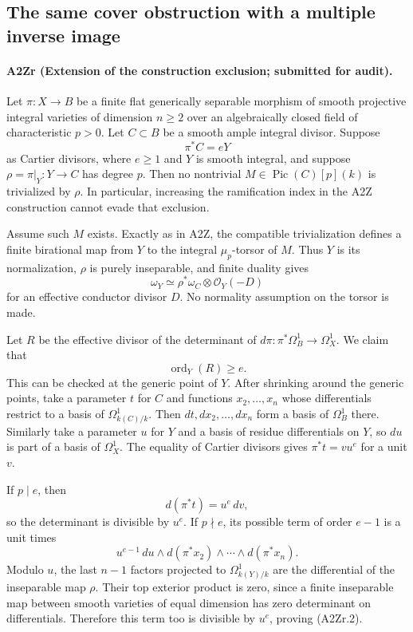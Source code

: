 \subsection{The same cover obstruction with a multiple inverse image}
\paragraph{A2Zr (Extension of the construction exclusion; submitted for audit).}
Let $\pi:X\to B$ be a finite flat generically separable morphism of
smooth projective integral varieties of dimension $n\geq2$ over an
algebraically closed field of characteristic $p>0$. Let $C\subset B$
be a smooth ample integral divisor. Suppose
\[
 \pi^*C=eY
\]
as Cartier divisors, where $e\geq1$ and $Y$ is smooth integral, and
suppose $\rho=\pi|_Y:Y\to C$ has degree $p$.
Then no nontrivial $M\in\operatorname{Pic}(C)[p](k)$ is trivialized
by $\rho$. In particular, increasing the ramification index in the
A2Z construction cannot evade that exclusion.

Assume such $M$ exists. Exactly as in A2Z, the compatible
trivialization defines a finite birational map from $Y$ to the
integral $\mu_p$-torsor of $M$. Thus $Y$ is its normalization,
$\rho$ is purely inseparable, and finite duality gives
\[
 \omega_Y\simeq\rho^*\omega_C\otimes\mathcal O_Y(-D)
                                                               \tag{A2Zr.1}
\]
for an effective conductor divisor $D$. No normality assumption on
the torsor is made.

Let $R$ be the effective divisor of the determinant of
$d\pi:\pi^*\Omega_B^1\to\Omega_X^1$. We claim that
\[
 \operatorname{ord}_Y(R)\geq e.                                \tag{A2Zr.2}
\]
This can be checked at the generic point of $Y$. After shrinking
around the generic points, take a parameter $t$ for $C$ and functions
$x_2,\ldots,x_n$ whose differentials restrict to a basis of
$\Omega^1_{k(C)/k}$. Then $dt,dx_2,\ldots,dx_n$ form a basis of
$\Omega^1_B$ there. Similarly take a parameter $u$ for $Y$ and a
basis of residue differentials on $Y$, so $du$ is part of a basis
of $\Omega^1_X$. The equality of Cartier divisors gives
$\pi^*t=v u^e$ for a unit $v$.

If $p\mid e$, then
\[
 d(\pi^*t)=u^e\,dv,
\]
so the determinant is divisible by $u^e$. If $p\nmid e$, its possible
term of order $e-1$ is a unit times
\[
 u^{e-1}\,du\wedge d(\pi^*x_2)\wedge\cdots\wedge d(\pi^*x_n).
\]
Modulo $u$, the last $n-1$ factors projected to
$\Omega^1_{k(Y)/k}$ are the differential of the inseparable map
$\rho$. Their top exterior product is zero, since a finite
inseparable map between smooth varieties of equal dimension has
zero determinant on differentials. Therefore this term too is
divisible by $u^e$, proving (A2Zr.2).

